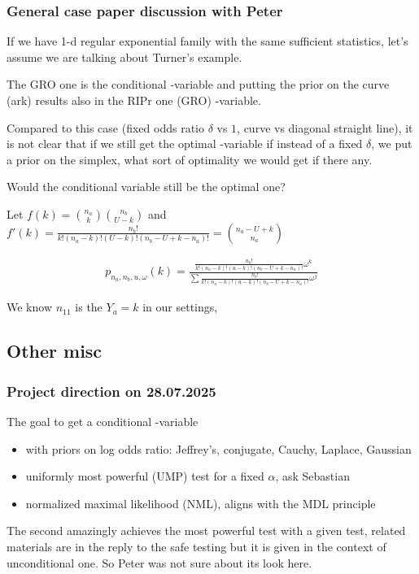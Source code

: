 \subsubsection{General case paper discussion with Peter}

If we have 1-d regular exponential family with the same sufficient statistics,
let's assume we are talking about Turner's example.

The GRO one is the conditional \E-variable and putting the prior on the curve (ark)
results also in the RIPr one (GRO) \E-variable.

Compared to this case (fixed odds ratio $\delta$ vs $1$, curve vs diagonal straight line),
it is not clear that if we still get the optimal \E-variable if instead of a fixed $\delta$,
we put a prior on the simplex, what sort of optimality we would get if there any.

Would the conditional variable still be the optimal one?


Let $f(k) = \binom{n_a}{k} \binom{n_b}{U-k}$ and $f'(k) = \frac{n_b!}{k!(n_a-k)!(U-k)!(n_b-U+k-n_a)!} = \binom{n_a - U + k}{n_a}$


\begin{align*}
	p_{n_a, n_b, u, \omega}(k) = \frac{\frac{n_b!}{k!(n_a-k)!(u-k)!(n_b-U+k-n_a)!}\omega^k}{\sum \frac{n_b!}{k!(n_a-k)!(u-k)!(n_b-U+k-n_a)!}\omega^j}
\end{align*}


We know $n_{11}$ is the $Y_a = k$ in our settings,

\subsection{Other misc}

\subsubsection{Project direction on 28.07.2025}

The goal to get a conditional \E-variable
\begin{itemize}
	\item with priors on log odds ratio: Jeffrey's, conjugate, Cauchy, Laplace, Gaussian
	\item uniformly most powerful (UMP) test for a fixed $\alpha$, ask Sebastian
	\item normalized maximal likelihood (NML), aligns with the MDL principle
\end{itemize}

The second amazingly achieves the most powerful test with a given test,
related materials are in the reply to the safe testing but it is given in
the context of unconditional one. So Peter was not sure about its look here.

